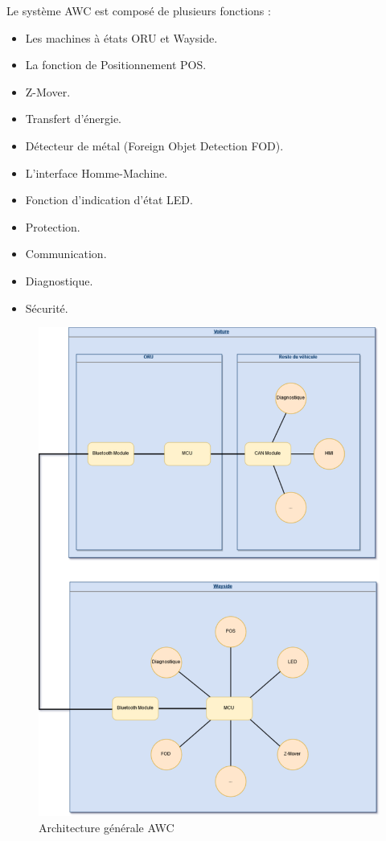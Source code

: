 Le système AWC est composé de plusieurs fonctions : 

\begin{itemize}
\item Les machines à états ORU et Wayside.
\item La fonction de Positionnement POS.
\item Z-Mover.
\item Transfert d’énergie.
\item Détecteur de métal (Foreign Objet Detection FOD).
\item L’interface Homme-Machine.
\item Fonction d’indication d’état LED.
\item Protection.
\item Communication.
\item Diagnostique.
\item Sécurité.
\end{itemize}

\begin{figure}[H]
 \centering
 \includegraphics[scale=0.4]{images/arch_awc}
 \caption{Architecture générale AWC}
\end{figure}

